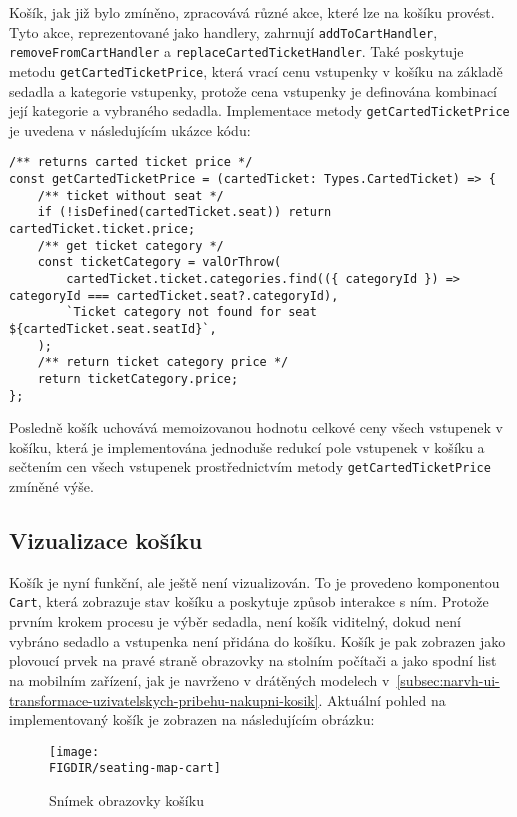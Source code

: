 Košík, jak již bylo zmíněno, zpracovává různé akce, které lze na košíku provést.
Tyto akce, reprezentované jako handlery, zahrnují \texttt{addToCartHandler}, \texttt{removeFromCartHandler} a \texttt{replaceCartedTicketHandler}.
Také poskytuje metodu \texttt{getCartedTicketPrice}, která vrací cenu vstupenky v košíku na základě sedadla a kategorie vstupenky, protože cena vstupenky je definována kombinací její kategorie a vybraného sedadla.
Implementace metody \texttt{getCartedTicketPrice} je uvedena v následujícím ukázce kódu:

\begin{verbatim}
/** returns carted ticket price */
const getCartedTicketPrice = (cartedTicket: Types.CartedTicket) => {
	/** ticket without seat */
	if (!isDefined(cartedTicket.seat)) return cartedTicket.ticket.price;
	/** get ticket category */
	const ticketCategory = valOrThrow(
		cartedTicket.ticket.categories.find(({ categoryId }) => categoryId === cartedTicket.seat?.categoryId),
		`Ticket category not found for seat ${cartedTicket.seat.seatId}`,
	);
	/** return ticket category price */
	return ticketCategory.price;
};
\end{verbatim}

Posledně košík uchovává memoizovanou hodnotu celkové ceny všech vstupenek v košíku, která je implementována jednoduše redukcí pole vstupenek v košíku a sečtením cen všech vstupenek prostřednictvím metody \texttt{getCartedTicketPrice} zmíněné výše.

\subsection{Vizualizace košíku}
\label{subsec:implementace-kosik-vizualizace}
Košík je nyní funkční, ale ještě není vizualizován.
To je provedeno komponentou \texttt{Cart}, která zobrazuje stav košíku a poskytuje způsob interakce s ním.
Protože prvním krokem procesu je výběr sedadla, není košík viditelný, dokud není vybráno sedadlo a vstupenka není přidána do košíku.
Košík je pak zobrazen jako plovoucí prvek na pravé straně obrazovky na stolním počítači a jako spodní list na mobilním zařízení, jak je navrženo v drátěných modelech v~\ref{subsec:narvh-ui-transformace-uzivatelskych-pribehu-nakupni-kosik}.
Aktuální pohled na implementovaný košík je zobrazen na následujícím obrázku:

\begin{figure}[h]
	\centering
	\texttt{[image: \\FIGDIR/seating-map-cart]}
	\caption{Snímek obrazovky košíku}
	\label{fig:seating-map-cart}
\end{figure}

